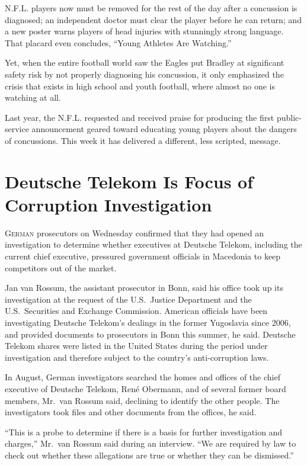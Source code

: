 ﻿\documentclass[12pt]{article}
\begin{document}
N.F.L. players now must be removed for the rest of the day after a concussion is diagnosed; an
independent doctor must clear the player before he can return; and a new poster warns players of
head injuries with stunningly strong language. That placard even concludes, ``Young Athletes Are
Watching.''

Yet, when the entire football world saw the Eagles put Bradley at significant safety risk by not
properly diagnosing his concussion, it only emphasized the crisis that exists in high school and
youth football, where almost no one is watching at all.

Last year, the N.F.L. requested and received praise for producing the first public-service
announcement geared toward educating young players about the dangers of concussions. This week it
has delivered a different, less scripted, message.

\pagebreak
\section{Deutsche Telekom Is Focus of Corruption Investigation}

\lettrine{G}{erman} prosecutors on Wednesday confirmed that they had opened
an investigation to determine whether executives at Deutsche Telekom, including the current chief
executive, pressured government officials in Macedonia to keep competitors out of the market.

Jan van Rossum, the assistant prosecutor in Bonn, said his office took up its investigation at the
request of the U.S.~Justice Department and the U.S.~Securities and Exchange Commission. American
officials have been investigating Deutsche Telekom's dealings in the former Yugoslavia since 2006,
and provided documents to prosecutors in Bonn this summer, he said. Deutsche Telekom shares were
listed in the United States during the period under investigation and therefore subject to the
country's anti-corruption laws.

In August, German investigators searched the homes and offices of the chief executive of Deutsche
Telekom, Ren\'e Obermann, and of several former board members, Mr.~van Rossum said, declining to
identify the other people. The investigators took files and other documents from the offices, he
said.

``This is a probe to determine if there is a basis for further investigation and charges,'' Mr.~van
Rossum said during an interview. ``We are required by law to check out whether these allegations are
true or whether they can be dismissed.''
\end{document}
